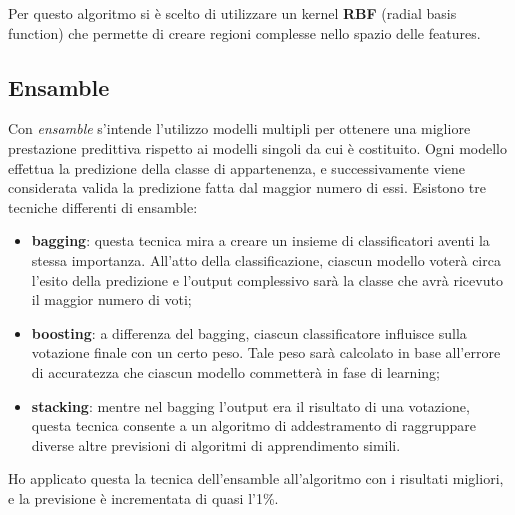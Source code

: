 \documentclass[12pt,a4paper]{article}
\begin{document}
Per questo algoritmo si è scelto di utilizzare un kernel \textbf{RBF} (radial basis function) che permette di creare regioni complesse nello spazio delle features.

\subsection{Ensamble}

Con \textit{ensamble} s'intende l'utilizzo modelli multipli per ottenere una migliore prestazione predittiva rispetto ai modelli singoli da cui è costituito. Ogni modello effettua la predizione della classe di appartenenza, e successivamente viene considerata valida la predizione fatta dal maggior numero di essi.
Esistono tre tecniche differenti di ensamble:
\begin{itemize}
    \item \textbf{bagging}: questa tecnica mira a creare un insieme di classificatori aventi la stessa importanza. All'atto della classificazione, ciascun modello voterà circa l'esito della predizione e l'output complessivo sarà la classe che avrà ricevuto il maggior numero di voti;
    \item \textbf{boosting}: a differenza del bagging, ciascun classificatore influisce sulla votazione finale con un certo peso. Tale peso sarà calcolato in base all'errore di accuratezza che ciascun modello commetterà in fase di learning;
    \item \textbf{stacking}: mentre nel bagging l'output era il risultato di una votazione, questa tecnica consente a un algoritmo di addestramento di raggruppare diverse altre previsioni di algoritmi di apprendimento simili.
\end{itemize}

Ho applicato questa la tecnica dell'ensamble all'algoritmo con i risultati migliori, e la previsione è incrementata di quasi l'1\%.
\end{document}
